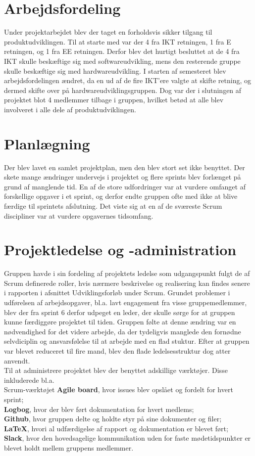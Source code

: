 \section{Arbejdsfordeling}
Under projektarbejdet blev der taget en forholdsvis sikker tilgang til produktudviklingen. Til at starte med var der 4 fra IKT retningen, 1 fra E retningen, 
og 1 fra EE retningen. Derfor blev det hurtigt besluttet at de 4 fra IKT skulle beskæftige sig med softwareudvikling, mens den resterende gruppe skulle
beskæftige sig med hardwareudvikling. I starten af semesteret blev arbejdsfordelingen ændret, da en ud af de fire IKT’ere valgte at skifte retning, og dermed 
skifte over på hardwareudviklingsgruppen. Dog var der i slutningen af projektet blot 4 medlemmer tilbage i gruppen, hvilket betød at alle blev involveret i 
alle dele af produktudviklingen. 


\section{Planlægning}
Der blev lavet en samlet projektplan, men den blev stort set ikke benyttet.
Der skete mange ændringer undervejs i projektet og flere sprints blev forlænget på grund af manglende tid. En af de store udfordringer var at vurdere omfanget 
af forskellige opgaver i et sprint, og derfor endte gruppen ofte med ikke at blive færdige til sprintets afslutning. Det viste sig at en af de sværeste Scrum 
discipliner var at vurdere opgavernes tidsomfang. 

\section{Projektledelse og -administration}
Gruppen havde i sin fordeling af projektets ledelse som udgangspunkt fulgt de af Scrum definerede roller, hvis nærmere beskrivelse og realisering kan findes 
senere i rapporten i afsnittet Udviklingsforløb under Scrum. Grundet problemer i udførelsen af arbejdsopgaver, bl.a. lavt engagement fra visse 
gruppemedlemmer, blev der fra sprint 6 derfor udpeget en leder, der skulle sørge for at gruppen kunne færdiggøre projektet til tiden. Gruppen følte at denne
ændring var en nødvendighed for det videre arbejde, da der tydeligvis manglede den fornødne selvdiciplin
og ansvarsfølelse til at arbejde med en flad stuktur. Efter at gruppen var blevet reduceret til fire mand, blev den flade ledelsesstruktur dog atter anvendt.
\\
Til at administrere projektet blev der benyttet adskillige værktøjer. Disse inkluderede bl.a. \\
Scrum-værktøjet \textbf{Agile board}, hvor issues blev opslået og fordelt for hvert sprint; \\
\textbf{Logbog}, hvor der blev ført dokumentation for hvert medlems; \\
\textbf{Github}, hvor gruppen delte og holdte styr på sine dokumenter og filer; \\
\textbf{LaTeX}, hvori al udfærdigelse af rapport og dokumentation er blevet ført; \\
\textbf{Slack}, hvor den hovedsagelige kommunikation uden for faste mødetidspunkter er blevet holdt mellem gruppens medlemmer.

